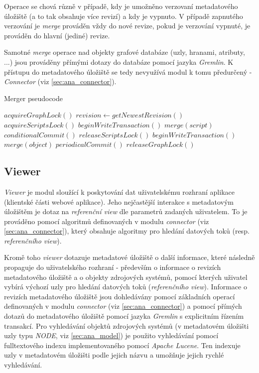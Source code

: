 Operace se chová různě v případě, kdy je umožněno verzovaní metadatového úložiště (a to tak obsahuje více revizí) a kdy je vypnuto. V případě zapnutého verzování je \textit{merge} prováděn vždy do nové revize, pokud je verzování vypnuté, je prováděn do hlavní (jediné) revize.

Samotné \textit{merge} operace nad objekty grafové databáze (uzly, hranami, atributy, ...) jsou prováděny přímými dotazy do databáze pomocí jazyka \textit{Gremlin}. K přístupu do metadatového úložiště se tedy nevyužívá modul k tomu předurčený - \textit{Connector} (viz \ref{sec:ana_connector}).

\begin{algorithm}
\caption{Merger pseudocode}
\label{alg_merger}
\begin{algorithmic}
	\State $acquireGraphLock()$
	\State $revision\gets getNewestRevision()$
		\State $acquireScriptsLock()$
			\State $beginWriteTransaction()$
			\State $merge(script)$
			\State $conditionalCommit()$
		\EndFor
		\State $releaseScriptsLock()$
		\State $beginWriteTransaction()$
			\State $merge(object)$
			\State $periodicalCommit()$
		\EndFor
	\EndIf
	\State $releaseGraphLock()$
\end{algorithmic}
\end{algorithm}

\subsection{Viewer}
\label{sec:ana_viewer}
\textit{Viewer} je modul sloužící k poskytování dat uživatelskému rozhraní aplikace (klientské části webové aplikace). Jeho nejčastější interakce s metadatovým úložištěm je dotaz na \textit{referenční view} dle parametrů zadaných uživatelem. To je prováděno pomocí algoritmů definovaných v modulu \textit{connector} (viz \ref{sec:ana_connector}), který obsahuje algoritmy pro hledání datových toků (resp. \textit{referenčního view}).

Kromě toho \textit{viewer} dotazuje metadatové úložiště o další informace, které následně propaguje do uživatelského rozhraní - především o informace o revizích metadatového úložiště a o objekty zdrojových systémů, pomocí kterých uživatel vybírá výchozí uzly pro hledání datových toků (\textit{referenčního view}). Informace o revizích metadatového úložiště jsou dohledávány pomocí základních operací definovaných v modulu \textit{connector} (viz \ref{sec:ana_connector}) a pomocí přímých dotazů do metadatového úložiště pomocí jazyka \textit{Gremlin} s explicitním řízením transakcí. Pro vyhledávání objektů zdrojových systémů (v metadatovém úložišti uzly typu \textit{NODE}, viz \ref{sec:ana_model}) je použito vyhledávání pomocí fulltextového indexu implementovaného pomocí \textit{Apache Lucene}. Ten indexuje uzly v metadatovém úložišti podle jejich názvu a umožňuje jejich rychlé vyhledávání.


